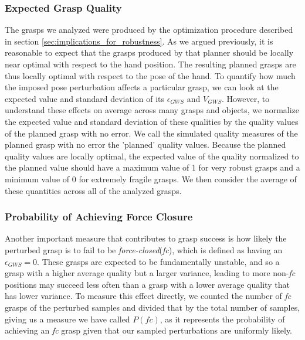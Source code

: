 \subsubsection{Expected Grasp Quality}
The grasps we analyzed were produced by the optimization procedure described in section \ref{sec:implications_for_robustness}. As we argued previously, it is reasonable to expect that the grasps produced by that planner should be locally near optimal with respect to the hand position. The resulting planned grasps are thus locally optimal with respect to the pose of the hand. To quantify how much the imposed pose perturbation affects a particular grasp, we can look at the expected value and standard deviation of its $\epsilon_{GWS}$ and $V_{GWS}$. However, to understand these effects on average across many grasps and objects, we normalize the expected value and standard deviation of these qualities by the quality values of the planned grasp with no error. We call the simulated quality measures of the planned grasp with no error the 'planned' quality values. Because the planned quality values are locally optimal, the expected value of the quality normalized to the planned value should have a maximum value of 1 for very robust grasps and a minimum value of 0 for extremely fragile grasps. We then consider the average of these quantities across all of the analyzed grasps. \par

\subsubsection{Probability of Achieving Force Closure}
\label{sec:successfraction}
Another important measure that contributes to grasp success is how likely the perturbed grasp is to fail to be \emph{force-closed}(\emph{fc}), which is defined as having an $\epsilon_{GWS}=0$.  These grasps are expected to be fundamentally unstable, and so a grasp with a higher average quality but a larger variance, leading to more non-\emph{fc} positions may succeed less often than a grasp with a lower average quality that has lower variance. To measure this effect directly, we counted the number of \emph{fc} grasps of the perturbed samples and divided that by the total number of samples, giving us a measure we have called $P(fc)$, as it represents the probability of achieving an \emph{fc} grasp given that our sampled perturbations are uniformly likely. 

